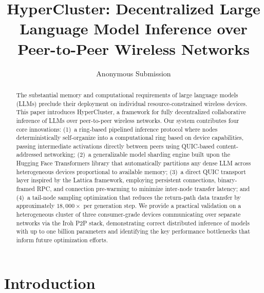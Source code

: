 \documentclass[runningheads]{llncs}
\begin{document}
%
\title{HyperCluster: Decentralized Large Language Model Inference over Peer-to-Peer Wireless Networks}
%
%
\author{Anonymous Submission}
%
%
%
\maketitle
%
\begin{abstract}
The substantial memory and computational requirements of large language models (LLMs) preclude their deployment on individual resource-constrained wireless devices. This paper introduces HyperCluster, a framework for fully decentralized collaborative inference of LLMs over peer-to-peer wireless networks. Our system contributes four core innovations: (1)~a ring-based pipelined inference protocol where nodes deterministically self-organize into a computational ring based on device capabilities, passing intermediate activations directly between peers using QUIC-based content-addressed networking; (2)~a generalizable model sharding engine built upon the Hugging Face Transformers library that automatically partitions any dense LLM across heterogeneous devices proportional to available memory; (3)~a direct QUIC transport layer inspired by the Lattica framework, employing persistent connections, binary-framed RPC, and connection pre-warming to minimize inter-node transfer latency; and (4)~a tail-node sampling optimization that reduces the return-path data transfer by approximately $18{,}000\times$ per generation step. We provide a practical validation on a heterogeneous cluster of three consumer-grade devices communicating over separate networks via the Iroh P2P stack, demonstrating correct distributed inference of models with up to one billion parameters and identifying the key performance bottlenecks that inform future optimization efforts.

\end{abstract}

\section{Introduction}
\label{sec:intro}
\end{document}
